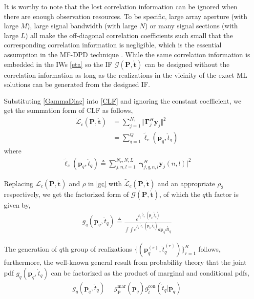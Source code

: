 \documentclass[review]{elsarticle}
\begin{document}
It is worthy to note that the lost correlation information can be ignored when there are enough observation resources. To be specific, large array aperture (with large $M$), large signal bandwidth (with large $N$) or many signal sections (with large $L$) all make the off-diagonal correlation coefficients such small that the corresponding correlation information is negligible, which is the essential assumption in the MF-DPD technique \cite{2004Direct}. While the same correlation information is embedded in the IWs \eqref{eta} so the IF $\mathcal{G}(\boldsymbol{P},\mathring{\boldsymbol{t}})$ can be designed without the correlation information as long as the realizations in the vicinity of the exact ML solutions can be generated from the designed IF.

Substituting \eqref{GammaDiag} into \eqref{CLF} and ignoring the constant coefficient, we get the summation form of CLF as follows,
\begin{align}\label{GLc}
    \tilde{\mathcal{L}}_c(\boldsymbol{P},\mathring{\boldsymbol{t}})&= \sum_{j=1}^{N_r}\Vert \boldsymbol{\Gamma}_{j}^H\boldsymbol{y}_j\Vert ^2\\
    &=\sum_{q=1}^Q \tilde{\ell}_c(\boldsymbol{p}_q,\mathring{t}_q)
\end{align}
where 
\begin{align}\label{glc}
    \tilde{\ell}_c(\boldsymbol{p}_q,\mathring{t}_q)\triangleq \sum_{j,n,l=1}^{N_r,N,L} \vert \boldsymbol{\gamma}_{j,q,n,l}^H\boldsymbol{y}_j(n,l)\vert ^2
\end{align}

Replacing $\mathcal{L}_c(\boldsymbol{P},\mathring{\boldsymbol{t}})$ and $\rho$ in \eqref{gc} with $\tilde{\mathcal{L}}_c(\boldsymbol{P},\mathring{\boldsymbol{t}})$ and an appropriate $\rho_2$ respectively, we get the factorized form of $\mathcal{G}(\boldsymbol{P},\mathring{\boldsymbol{t}})$, of which the $q$th factor is given by,
\begin{align}\label{gq}
    g_q(\boldsymbol{p}_q,\mathring{t}_q)\triangleq\frac{e^{\rho_2 \tilde{\ell}_c(\boldsymbol{p}_q,\mathring{t}_q)}}{\int\int e^{\rho_2 \tilde{\ell}_c(\boldsymbol{p}_q,\mathring{t}_q)}d\boldsymbol{p}_qd\mathring{t}_q }
\end{align}

The generation of $q$th group of realizations $\lbrace(\boldsymbol{p}_q^{(r)},\mathring{t}_q^{(r)})\rbrace_{r=1}^{R}$ follows, furthermore, the well-known general result from probability theory that the joint pdf $g_q(\boldsymbol{p}_q,\mathring{t}_q)$ can be factorized as the product of marginal and conditional pdfs,
\begin{align}\label{gppt}
    g_q(\boldsymbol{p}_q,\mathring{t}_q)=g_{\boldsymbol{p}}^{\text{mar}}(\boldsymbol{p}_q)g_{\mathring{t}}^{\text{con}}(\mathring{t}_q\vert \boldsymbol{p}_q)
\end{align}
\end{document}
